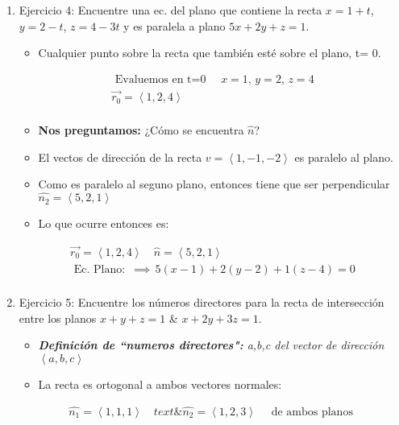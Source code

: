 \documentclass{article}
\begin{document}
\begin{enumerate}
    \item Ejercicio 4: Encuentre una ec. del plano que contiene  la recta $x=1+t$, $y=2-t$, $z=4-3t$ y es paralela a plano $5x+2y+z=1$.
        \begin{itemize}
            \item Cualquier punto sobre la recta que también esté sobre el plano, t= 0. 
        \end{itemize}
        \begin{align*}
            \text{  Evaluemos en t=0  } \quad x=1, \, y=2, \, z=4\\
            \vec{r_0}= \left\langle 1,2,4 \right\rangle  \\ 
        \end{align*}
        \begin{itemize}
            \item \textbf{Nos preguntamos:} ¿Cómo se encuentra $\hat{n}$?
            \item El vectos de dirección de la recta $v=\left\langle 1,-1,-2 \right\rangle$ es paralelo al plano.
            \item Como es paralelo al seguno plano, entonces tiene que ser perpendicular $\hat{n_2} = \left\langle 5,2,1 \right\rangle$
            \item Lo que ocurre entonces es:
        \end{itemize}
            \begin{align*}
                \vec{r_0} = \left\langle 1,2,4 \right\rangle \quad \hat{n}= \left\langle 5,2,1 \right\rangle \\ 
                \text{  Ec. Plano:  } \, \implies \, 5(x-1) + 2(y-2)+1(z-4)=0 \\ 
            \end{align*}
    \item Ejercicio 5: Encuentre los números directores para la recta de intersección entre los planos $x+y+z=1$ \& $x+2y+3z=1$.
            \begin{itemize}
                \item \emph{\textbf{Definición de ``numeros directores":} a,b,c del vector de dirección $\left\langle a,b,c \right\rangle $}
                \item La recta es ortogonal a ambos vectores normales:
            \end{itemize}
            \begin{align*}
                \hat{n_1} = \left\langle 1,1,1 \right\rangle \quad text{ \& } \hat{n_2} = \left\langle 1,2,3 \right\rangle \quad \text{  de ambos planos  }\\

\end{align*}
\end{enumerate}
\end{document}
